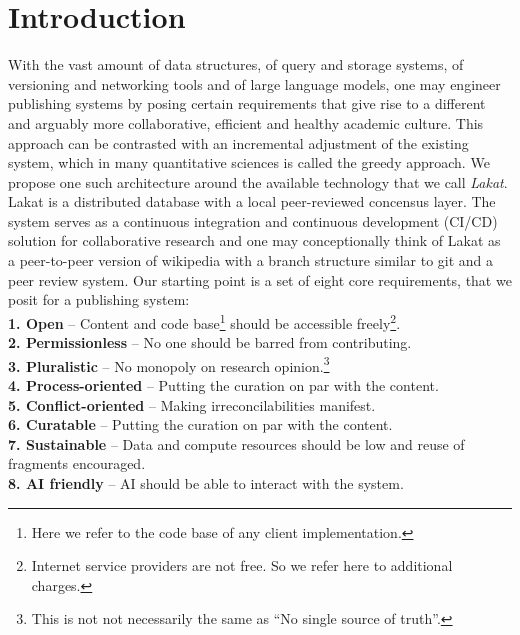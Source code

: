 
\section{Introduction}

With the vast amount of data structures, of query and storage systems, of versioning and networking tools and of large language models, one may engineer publishing systems by posing certain requirements that give rise to a different and arguably more collaborative, efficient and healthy academic culture. This approach can be contrasted with an incremental adjustment of the existing system, which in many quantitative sciences is called the greedy approach. We propose one such architecture around the available technology that we call \textit{Lakat}.
Lakat is a distributed database with a local peer-reviewed concensus layer. The system serves as a continuous integration and continuous development (CI/CD) solution for collaborative research and one may conceptionally think of Lakat as a peer-to-peer  version of wikipedia with a branch structure similar to git and a peer review system.
Our starting point is a set of eight core requirements, that we posit for a publishing system:\\

\indent \textbf{1. Open} -- 
 Content and code base\footnote{Here we refer to the code base of any client implementation.} should be accessible freely\footnote{Internet service providers are not free. So we refer here to additional charges.}.\\
\indent\textbf{2. Permissionless} --
 No one should be barred from contributing.\\
\indent\textbf{3. Pluralistic} -- No monopoly on research opinion.\footnote{This is not not necessarily the same as ``No single source of truth''.}\\
\indent\textbf{4. Process-oriented} -- Putting the curation on par with the content.\\
\indent\textbf{5. Conflict-oriented} -- Making irreconcilabilities manifest.\\
\indent\textbf{6. Curatable} -- Putting the curation on par with the content.\\
\indent\textbf{7. Sustainable} -- 
 Data and compute resources should be low and reuse of fragments encouraged.\\
\indent\textbf{8. AI friendly} -- AI should be able to interact with the system.\\

